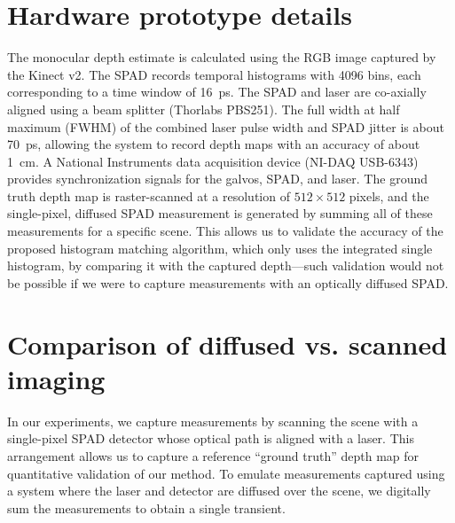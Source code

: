 \documentclass[runningheads]{llncs}
\newcommand{\edit}[1]{\textcolor{black}{#1}}
\begin{document}
\section{Hardware prototype details}
The monocular depth estimate is calculated using the RGB image captured by the Kinect v2. The SPAD records temporal histograms with 4096 bins, each corresponding to a time window of 16~ps. The SPAD and laser are co-axially aligned using a beam splitter (Thorlabs PBS251). The full width at half maximum (FWHM) of the combined laser pulse width and SPAD jitter is about 70~ps, allowing the system to record depth maps with an accuracy of about 1~cm. A National Instruments data acquisition device (NI-DAQ USB-6343) provides synchronization signals for the galvos, SPAD, and laser. The ground truth depth map is raster-scanned at a resolution of $512 \times 512$ pixels, and the single-pixel, diffused SPAD measurement is generated by summing all of these measurements for a specific scene. This allows us to validate the accuracy of the proposed histogram matching algorithm, which only uses the integrated single histogram, by comparing it with the captured depth---such validation would not be possible if we were to capture measurements with an optically diffused SPAD.


\section{Comparison of diffused vs. scanned imaging}
In our experiments, we capture measurements by scanning the scene with a
single-pixel SPAD detector whose optical path is aligned with a laser. This
arrangement allows us to capture a reference ``ground truth'' depth map for
quantitative validation of our method. To emulate measurements captured using a
system where the laser and detector are diffused over the scene, we digitally
sum the measurements to obtain a single transient. 

\end{document}

